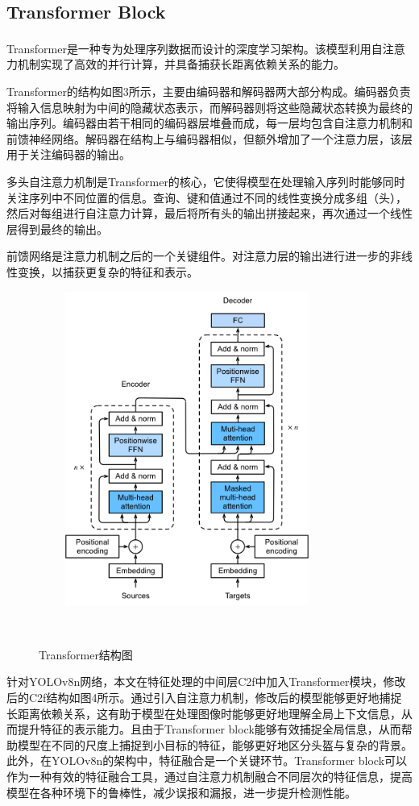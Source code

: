 \documentclass[journal]{IEEEtran}
\begin{document}
\subsection{Transformer Block}
Transformer\textsuperscript{\cite{2}}是一种专为处理序列数据而设计的深度学习架构。该模型利用自注意力机制实现了高效的并行计算，并具备捕获长距离依赖关系的能力。\par
Transformer的结构如图3所示，主要由编码器和解码器两大部分构成。编码器负责将输入信息映射为中间的隐藏状态表示，而解码器则将这些隐藏状态转换为最终的输出序列。编码器由若干相同的编码器层堆叠而成，每一层均包含自注意力机制和前馈神经网络。解码器在结构上与编码器相似，但额外增加了一个注意力层，该层用于关注编码器的输出。\par
多头自注意力机制是Transformer的核心，它使得模型在处理输入序列时能够同时关注序列中不同位置的信息。查询、键和值通过不同的线性变换分成多组（头），然后对每组进行自注意力计算，最后将所有头的输出拼接起来，再次通过一个线性层得到最终的输出。\par
前馈网络是注意力机制之后的一个关键组件。对注意力层的输出进行进一步的非线性变换，以捕获更复杂的特征和表示。\par
\begin{figure}[htbp] 

   \centering
   \includegraphics[width=8cm]{figures/4_3.png}
   \caption{Transformer结构图} 
   \label{fig:} 
  
\end{figure} 
针对YOLOv8n网络，本文在特征处理的中间层C2f中加入Transformer模块，修改后的C2f结构如图4所示。通过引入自注意力机制，修改后的模型能够更好地捕捉长距离依赖关系，这有助于模型在处理图像时能够更好地理解全局上下文信息，从而提升特征的表示能力。且由于Transformer block能够有效捕捉全局信息，从而帮助模型在不同的尺度上捕捉到小目标的特征，能够更好地区分头盔与复杂的背景。此外，在YOLOv8n的架构中，特征融合是一个关键环节。Transformer block可以作为一种有效的特征融合工具，通过自注意力机制融合不同层次的特征信息，提高模型在各种环境下的鲁棒性，减少误报和漏报，进一步提升检测性能。\par
\end{document}
